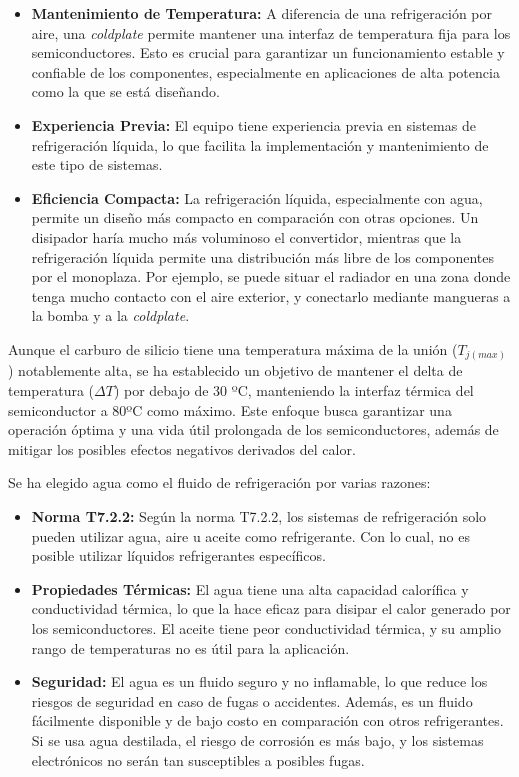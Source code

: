 \begin{itemize}
	\item \textbf{Mantenimiento de Temperatura:} A diferencia de una refrigeración por aire, una \textit{coldplate} permite mantener una interfaz de temperatura fija para los semiconductores. Esto es crucial para garantizar un funcionamiento estable y confiable de los componentes, especialmente en aplicaciones de alta potencia como la que se está diseñando.
	
	\item \textbf{Experiencia Previa:} El equipo tiene experiencia previa en sistemas de refrigeración líquida, lo que facilita la implementación y mantenimiento de este tipo de sistemas.
	
	\item \textbf{Eficiencia Compacta:} La refrigeración líquida, especialmente con agua, permite un diseño más compacto en comparación con otras opciones. Un disipador haría mucho más voluminoso el convertidor, mientras que la refrigeración líquida permite una distribución más libre de los componentes por el monoplaza. Por ejemplo, se puede situar el radiador en una zona donde tenga mucho contacto con el aire exterior, y conectarlo mediante mangueras a la bomba y a la \textit{coldplate}.
	
	
\end{itemize}

Aunque el carburo de silicio tiene una temperatura máxima de la unión (\(T_{j(max)}\)) notablemente alta, se ha establecido un objetivo de mantener el delta de temperatura (\(\Delta T\)) por debajo de 30 ºC, manteniendo la interfaz térmica del semiconductor a 80ºC como máximo. Este enfoque busca garantizar una operación óptima y una vida útil prolongada de los semiconductores, además de mitigar los posibles efectos negativos derivados del calor.

Se ha elegido agua como el fluido de refrigeración por varias razones:

\begin{itemize}
	\item \textbf{Norma T7.2.2:} Según la norma T7.2.2, los sistemas de refrigeración solo pueden utilizar agua, aire u aceite como refrigerante. Con lo cual, no es posible utilizar líquidos refrigerantes específicos.
	
	\item \textbf{Propiedades Térmicas:} El agua tiene una alta capacidad calorífica y conductividad térmica, lo que la hace eficaz para disipar el calor generado por los semiconductores. El aceite tiene peor conductividad térmica, y su amplio rango de temperaturas no es útil para la aplicación.
	
	\item \textbf{Seguridad:} El agua es un fluido seguro y no inflamable, lo que reduce los riesgos de seguridad en caso de fugas o accidentes. Además, es un fluido fácilmente disponible y de bajo costo en comparación con otros refrigerantes. Si se usa agua destilada, el riesgo de corrosión es más bajo, y los sistemas electrónicos no serán tan susceptibles a posibles fugas.
	
\end{itemize}


